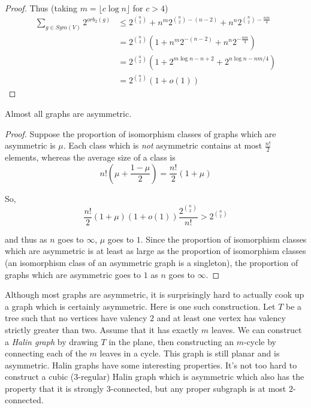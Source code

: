 \begin{proof}
	Thus (taking $m=\lfloor c\log{n}\rfloor$ for $c>4$)
	\begin{align*}
	\sum\limits_{g\in Sym(V)}2^{orb_2(g)} &\leq 2^{\binom{n}{2}} + n^m2^{\binom{n}{2}-(n-2)}+n^n2^{\binom{n}{2}-\frac{nm}{4}}\\
	                                      &= 2^{\binom{n}{2}}\left(1+n^m2^{-(n-2)}+n^n2^{-\frac{nm}{4}}\right)\\
	                                      &=2^{\binom{n}{2}}\left(1+ 2^{m\log{n}-n+2}+2^{n\log{n}-nm{/}4}   \right)\\
	                                      &= 2^{\binom{n}{2}}\left(1+ o(1)   \right)
	\end{align*}
	
\end{proof}

\begin{lemma}
	{Almost all graphs are asymmetric.}
\end{lemma}

\begin{proof}
	
	
	Suppose the proportion of isomorphism classes of graphs which are asymmetric is $\mu$.  Each class which is \textit{not} asymmetric contains at most $\frac{n!}{2}$ elements, whereas the average size of a class is $$n!\left(\mu+\frac{1-\mu}{2}\right)=\frac{n!}{2}(1+\mu)$$
	
	So,
	$$\frac{n!}{2}(1+\mu)(1+o(1))\frac{2^{\binom{n}{2}}}{n!}>2^{\binom{n}{2}}$$
	
	and thus as $n$ goes to  $\infty$, $\mu$ goes to $1$.  Since the proportion of isomorphism classes which are asymmetric is at least as large as the proportion of isomorphism classes (an isomorphism class of an asymmetric graph is a singleton), the proportion of graphs which are asymmetric goes to $1$ as $n$ goes to $\infty$.

\end{proof}

Although most graphs are asymmetric, it is surprisingly hard to actually cook up a graph which is certainly asymmetric.  Here is one such construction.  Let $T$ be a tree such that no vertices have valency $2$ and at least one vertex has valency strictly greater than two.  Assume that it has exactly $m$ leaves.  We can construct a \textit{Halin graph} by drawing $T$ in the plane, then constructing an $m$-cycle by connecting each of the $m$ leaves in a cycle.  This graph is still planar and is asymmetric. Halin graphs have some interesting properties.  It's not too hard to construct a cubic ($3$-regular) Halin graph which is asymmetric which also has the property that it is strongly $3$-connected, but any proper subgraph is at most $2$-connected.

